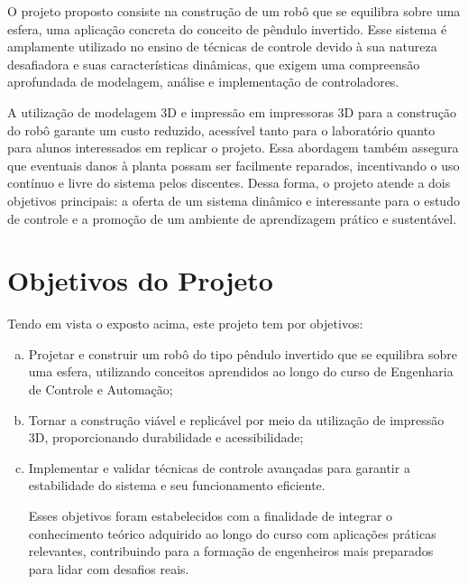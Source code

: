 O projeto proposto consiste na construção de um robô que se equilibra sobre uma esfera, uma aplicação concreta do conceito de pêndulo invertido. Esse sistema é amplamente utilizado no ensino de técnicas de controle devido à sua natureza desafiadora e suas características dinâmicas, que exigem uma compreensão aprofundada de modelagem, análise e implementação de controladores.

A utilização de modelagem 3D e impressão em impressoras 3D para a construção do robô garante um custo reduzido, acessível tanto para o laboratório quanto para alunos interessados em replicar o projeto. Essa abordagem também assegura que eventuais danos à planta possam ser facilmente reparados, incentivando o uso contínuo e livre do sistema pelos discentes. Dessa forma, o projeto atende a dois objetivos principais: a oferta de um sistema dinâmico e interessante para o estudo de controle e a promoção de um ambiente de aprendizagem prático e sustentável.


\section{Objetivos do Projeto}
\label{sec:objetivos}

Tendo em vista o exposto acima, este projeto tem por objetivos:

\begin{enumerate}[a)]
\item  Projetar e construir um robô do tipo pêndulo invertido que se equilibra sobre uma esfera, utilizando conceitos aprendidos ao longo do curso de Engenharia de Controle e Automação;
\item Tornar a construção viável e replicável por meio da utilização de impressão 3D, proporcionando durabilidade e acessibilidade; 
\item Implementar e validar técnicas de controle avançadas para garantir a estabilidade do sistema e seu funcionamento eficiente.

Esses objetivos foram estabelecidos com a finalidade de integrar o conhecimento teórico adquirido ao longo do curso com aplicações práticas relevantes, contribuindo para a formação de engenheiros mais preparados para lidar com desafios reais.
\end{enumerate}

